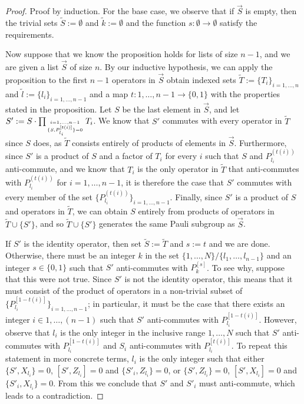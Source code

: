 \documentclass[twocolumn,showpacs,preprintnumbers,amsmath,amssymb,nofootinbib,pra,floatfix]{revtex4}
\newcommand{\lst}{\vec}
\newcommand{\set}{\tilde}
\begin{document}
\begin{proof}
Proof by induction.  For the base case, we observe that if $\lst S$ is empty, then the trivial sets $\set S:=\emptyset$ and $\set k :=\emptyset$ and the function $s:\emptyset\to\emptyset$ satisfy the requirements.

Now suppose that we know the proposition holds for lists of size $n-1$, and we are given a list $\lst S$ of size $n$.  By our inductive hypothesis, we can apply the proposition to the first $n-1$ operators in $\lst S$ obtain indexed sets $\set T:=\{T_i\}_{i=1,\dots,n}$ and $\set l := \{l_i\}_{i=1,\dots,n-1}$ and a map $t:1,\dots,n-1\to \{0,1\}$ with the properties stated in the proposition.  Let $S$ be the last element in $\lst S$, and let $S':=S\cdot \prod_{i=1,\dots,n-1 \atop \{S,P_{l_i}^{[t(i)]}\}=0} T_i$.  We know that $S'$ commutes with every operator in $\set T$ since $S$ does, as $\set T$ consists entirely of products of elements in $\lst S$.  Furthermore, since $S'$ is a product of $S$ and a factor of $T_i$ for every $i$ such that $S$ and $P_{l_i}^{(t(i))}$ anti-commute, and we know that $T_i$ is the only operator in $\set T$ that anti-commutes with $P_{l_i}^{(t(i))}$ for $i=1,\dots,n-1$, it is therefore the case that $S'$ commutes with every member of the set $\{P_{l_i}^{(t(i))}\}_{i=1,\dots,n-1}$.  Finally, since $S'$ is a product of $S$ and operators in $\set T$, we can obtain $S$ entirely from products of operators in $\set T \cup \{S'\}$, and so $\set T \cup \{S'\}$ generates the same Pauli subgroup as $\lst S$.

If $S'$ is the identity operator, then set $\set S:=\set T$ and $s:=t$ and we are done.  Otherwise, there must be an integer $k$ in the set $\{1,\dots,N\}\slash\{l_1,\dots,l_{n-1}\}$ and an integer $s\in\{0,1\}$ such that $S'$ anti-commutes with $P_k^{[s]}$.  To see why, suppose that this were not true.  Since $S'$ is not the identity operator, this means that it must consist of the product of operators in a non-trivial subset of $\{P_{l_i}^{[1-t(i)]}\}_{i=1,\dots,n-1}$;  in particular, it must be the case that there exists an integer $i\in 1,\dots,(n-1)$ such that $S'$ anti-commutes with $P_{l_i}^{[1-t(i)]}$.  However, observe that $l_i$ is the only integer in the inclusive range $1,\dots, N$ such that $S'$ anti-commutes with $P_{l_i}^{[1-t(i)]}$ and $S_i$ anti-commutes with $P_{l_i}^{[t(i)]}$.  To repeat this statement in more concrete terms, $l_i$ is the only integer such that either $\{S',X_{l_i}\}=0$, $[S',Z_{l_i}]=0$ and $\{S'_i,Z_{l_i}\}=0$, or $\{S',Z_{l_i}\}=0$, $[S',X_{l_i}]=0$ and $\{S'_i,X_{l_i}\}=0$.  From this we conclude that $S'$ and $S'_i$ must anti-commute, which leads to a contradiction.


\end{proof}
\end{document}
